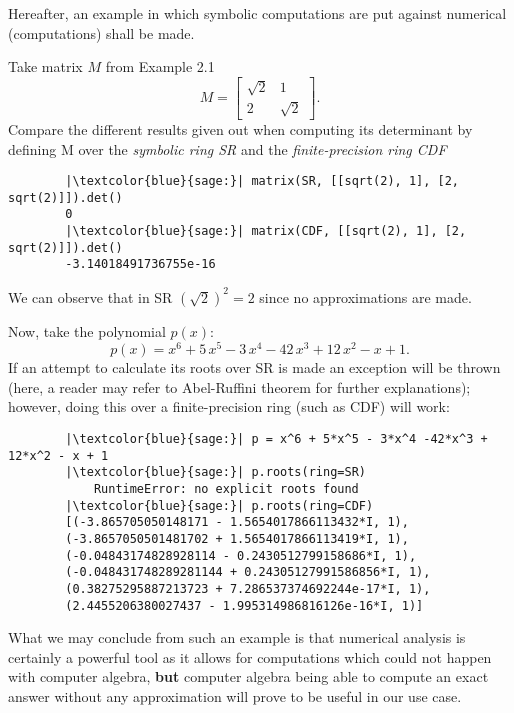 Hereafter, an example in which symbolic computations are put against numerical (computations) shall be made.
\begin{example}
    Take matrix $M$ from Example 2.1
    \[
        M = \begin{bmatrix}
            \sqrt{2}  &   1    \\
                2     & \sqrt{2}
        \end{bmatrix}.
    \]
    Compare the different results given out when computing its determinant by defining M over the \textit{symbolic ring SR} and
    the \textit{finite-precision ring CDF}
    \begin{verbatim}
        |\textcolor{blue}{sage:}| matrix(SR, [[sqrt(2), 1], [2, sqrt(2)]]).det()
        0
        |\textcolor{blue}{sage:}| matrix(CDF, [[sqrt(2), 1], [2, sqrt(2)]]).det()
        -3.14018491736755e-16
    \end{verbatim}
    We can observe that in SR \((\sqrt{2})^2 = 2\) since no approximations are made.

    Now, take the polynomial \(p(x)\):
    \[
        p(x) = x^{6} + 5 \, x^{5} - 3 \, x^{4} - 42 \, x^{3} + 12 \, x^{2} - x + 1.
    \]
    If an attempt to calculate its roots over SR is made an exception will be thrown (here, a reader may refer to
    Abel-Ruffini theorem for further explanations); however, doing this over a finite-precision ring (such as CDF) will work:
    \begin{verbatim}
        |\textcolor{blue}{sage:}| p = x^6 + 5*x^5 - 3*x^4 -42*x^3 + 12*x^2 - x + 1
        |\textcolor{blue}{sage:}| p.roots(ring=SR)
            RuntimeError: no explicit roots found
        |\textcolor{blue}{sage:}| p.roots(ring=CDF)
        [(-3.865705050148171 - 1.5654017866113432*I, 1),
        (-3.8657050501481702 + 1.5654017866113419*I, 1),
        (-0.04843174828928114 - 0.2430512799158686*I, 1),
        (-0.048431748289281144 + 0.24305127991586856*I, 1),
        (0.38275295887213723 + 7.286537374692244e-17*I, 1),
        (2.4455206380027437 - 1.995314986816126e-16*I, 1)]
    \end{verbatim}
\end{example}

What we may conclude from such an example is that numerical analysis is certainly a powerful tool as it allows for computations
which could not happen with computer algebra, \textbf{but} computer algebra being able to compute an exact answer without
any approximation will prove to be useful in our use case.

